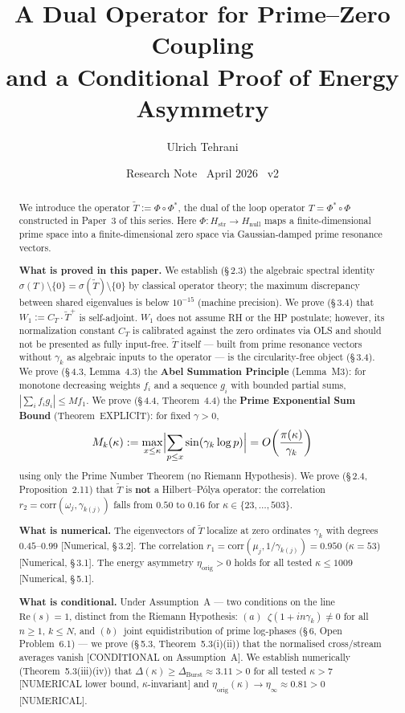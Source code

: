 \documentclass[11pt]{article}
\title{\vspace{-1.5em}\bfseries A Dual Operator for Prime--Zero Coupling\\[0.4em]
\large and a Conditional Proof of Energy Asymmetry}
\author{Ulrich Tehrani}
\date{Research Note \textperiodcentered\ April 2026 \textperiodcentered\ v2}
\newcommand{\Hstr}{H_{\mathrm{str}}}
\newcommand{\Hnull}{H_{\mathrm{null}}}
\newcommand{\etaorig}{\eta_{\mathrm{orig}}}
\newcommand{\Tt}{\widetilde{T}}
\newcommand{\CT}{C_{T}}
\newcommand{\Wone}{W_1}
\newcommand{\Dburstvar}{\Delta_{\mathrm{Burst}}}
\begin{document}
\maketitle

\begin{abstract}
We introduce the operator $\Tt := \Phi \circ \Phi^*$,
the dual of the loop operator $T = \Phi^* \circ \Phi$ constructed in Paper~3
of this series. Here $\Phi\colon\Hstr \to \Hnull$ maps a
finite-dimensional prime space into a finite-dimensional zero space via
Gaussian-damped prime resonance vectors.

\textbf{What is proved in this paper.}
We establish (\S\,2.3) the algebraic spectral identity
$\sigma(T)\setminus\{0\} = \sigma(\Tt)\setminus\{0\}$
by classical operator theory; the maximum discrepancy between shared
eigenvalues is below $10^{-15}$ (machine precision).
We prove (\S\,3.4) that $\Wone := \CT\cdot\Tt^+$ is self-adjoint.
$\Wone$ does not assume RH or the HP postulate; however, its normalization
constant $\CT$ is calibrated against the zero ordinates via OLS and should
not be presented as fully input-free.
$\Tt$ itself --- built from prime resonance vectors without $\gamma_k$ as
algebraic inputs to the operator --- is the circularity-free object (\S\,3.4).
We prove (\S\,4.3, Lemma~4.3) the \textbf{Abel Summation Principle} (Lemma~M3):
for monotone decreasing weights $f_i$ and a sequence $g_i$ with bounded
partial sums, $|\sum_i f_i g_i| \leq M f_1$.
We prove (\S\,4.4, Theorem~4.4) the \textbf{Prime Exponential Sum Bound}
(Theorem~EXPLICIT): for fixed $\gamma > 0$,
\[
M_k(\kappa) := \max_{x \leq \kappa}\Bigl|\sum_{p \leq x}\sin(\gamma_k\log p)\Bigr|
= O\!\left(\frac{\pi(\kappa)}{\gamma_k}\right)
\]
using only the Prime Number Theorem (no Riemann Hypothesis).
We prove (\S\,2.4, Proposition~2.11) that $\Tt$ is \textbf{not} a
Hilbert--P\'olya operator: the correlation
$r_2 = \mathrm{corr}(\omega_j,\gamma_{k(j)})$
falls from $0.50$ to $0.16$ for $\kappa\in\{23,\ldots,503\}$.

\textbf{What is numerical.}
The eigenvectors of $\Tt$ localize at zero ordinates $\gamma_k$
with degrees $0.45$--$0.99$ [Numerical, \S\,3.2].
The correlation $r_1 = \mathrm{corr}(\mu_j,1/\gamma_{k(j)}) = 0.950$
($\kappa=53$) [Numerical, \S\,3.1].
The energy asymmetry $\etaorig > 0$ holds for all tested $\kappa\leq 1009$
[Numerical, \S\,5.1].

\textbf{What is conditional.}
Under Assumption~A --- two conditions on the line
$\mathrm{Re}(s)=1$, distinct from the Riemann Hypothesis:
$(a)$~$\zeta(1+in\gamma_k)\neq 0$ for all $n\geq 1$, $k\leq N$, and
$(b)$~joint equidistribution of prime log-phases (\S\,6, Open Problem~6.1)
--- we prove (\S\,5.3, Theorem~5.3(i)(ii)) that the normalised cross/stream
averages vanish [CONDITIONAL on Assumption~A].
We establish numerically (Theorem~5.3(iii)(iv)) that
$\Delta(\kappa)\geq\Dburstvar\approx 3.11 > 0$ for all tested $\kappa > 7$
[NUMERICAL lower bound, $\kappa$-invariant] and
$\etaorig(\kappa)\to\eta_\infty\approx 0.81 > 0$ [NUMERICAL].


\end{abstract}
\end{document}
